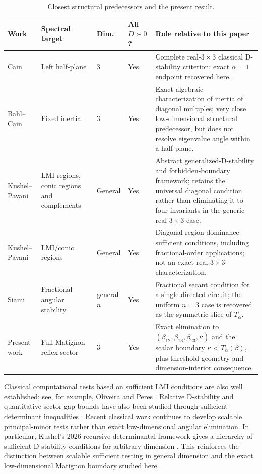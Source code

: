 \begin{table}[ht]
\centering
\small
\caption{Closest structural predecessors and the present result.}
\label{tab:prior-art}
\setlength{\tabcolsep}{3pt}
\begin{tabular}{>{\raggedright\arraybackslash}p{2.45cm}>{\raggedright\arraybackslash}p{2.7cm}>{\raggedright\arraybackslash}p{1.55cm}>{\raggedright\arraybackslash}p{1.85cm}>{\raggedright\arraybackslash}p{4.55cm}}
\toprule
Work & Spectral target & Dim. & All \(D\succ0\)? & Role relative to this paper\\
\midrule
Cain \citep{Cain1976}
& Left half-plane
& \(3\)
& Yes
& Complete real-\(3\times3\) classical D-stability criterion; exact \(\alpha=1\) endpoint recovered here.\\[2mm]

Bahl--Cain \citep{BahlCain1977}
& Fixed inertia
& \(3\)
& Yes
& Exact algebraic characterization of inertia of diagonal multiples; very close low-dimensional structural predecessor, but does not resolve eigenvalue angle within a half-plane.\\[2mm]

Kushel--Pavani \citep{KushelPavani2022}
& LMI regions, conic regions and complements
& General
& Yes
& Abstract generalized-D-stability and forbidden-boundary framework; retains the universal diagonal condition rather than eliminating it to four invariants in the generic real-\(3\times3\) case.\\[2mm]

Kushel--Pavani \citep{KushelPavani2021}
& LMI/conic regions
& General
& Yes
& Diagonal region-dominance sufficient conditions, including fractional-order applications; not an exact real-\(3\times3\) characterization.\\[2mm]

Siami \citep{Siami2021}
& Fractional angular stability
& general \(n\)
& Yes
& Fractional secant condition for a single directed circuit; the uniform \(n=3\) case is recovered as the symmetric slice of \(T_\alpha\).\\[2mm]

Present work
& Full Matignon reflex sector
& \(3\)
& Yes
& Exact elimination to \((\beta_{12},\beta_{13},\beta_{23},\kappa)\) and the scalar boundary \(\kappa<T_\alpha(\beta)\), plus threshold geometry and dimension-interior consequence.\\
\bottomrule
\end{tabular}
\end{table}

Classical computational tests based on sufficient LMI conditions are also well established; see, for example, Oliveira and Peres \citep{OliveiraPeres2004}. Relative D-stability and quantitative sector-gap bounds have also been studied through sufficient determinant inequalities \citep{Kushel2023}. Recent classical work continues to develop scalable principal-minor tests rather than exact low-dimensional angular elimination. In particular, Kushel's 2026 recursive determinantal framework gives a hierarchy of sufficient D-stability conditions for arbitrary dimension \citep{Kushel2026}. This reinforces the distinction between scalable sufficient testing in general dimension and the exact low-dimensional Matignon boundary studied here.


